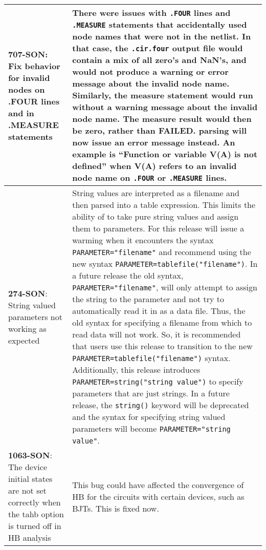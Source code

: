 {\begin{longtable}[h] {>{\raggedright\small}m{2in}|>{\raggedright\let\\\tabularnewline\small}m{3.5in}}
     \textbf{707-SON}: Fix behavior for invalid nodes on .FOUR lines and in 
     .MEASURE statements & There were issues with \texttt{.FOUR} lines and
     \texttt{.MEASURE} statements that accidentally used node names that
     were not in the netlist.  In that case, the \texttt{.cir.four} output
     file would contain a mix of all zero's and NaN's, and \Xyce{} would 
     not produce a warning or error message about the invalid node name.
     Similarly, the measure statement would run without a warning message
     about the invalid node name.  The measure result would then be zero,
     rather than FAILED.  \Xyce{} parsing will now issue an error message
     instead.  An example is ``Function or variable V(A) is not defined'' 
     when V(A) refers to an invalid node name on \texttt{.FOUR} or 
     \texttt{.MEASURE} lines. \\ \hline
     
     \textbf{274-SON}: String valued parameters not working as expected &
     String values are interpreted as a filename and then parsed into a 
     table expression.  This limits the ability of \Xyce{} to take pure
     string values and assign them to parameters.  For this release
     \Xyce{} will issue a warming when it encounters the syntax 
     \texttt{PARAMETER="filename"} and recommend using the new syntax
     \texttt{PARAMETER=tablefile("filename")}.  In a future \Xyce{} release
     the old syntax, \texttt{PARAMETER="filename"}, will only attempt to assign
     the string to the parameter and not try to automatically read it in
     as a data file.  Thus, the old syntax for specifying a filename from 
     which to read data will not work.  So, it is recommended that users use this
     release to transition to the new \texttt{PARAMETER=tablefile("filename")}
     syntax.  Additionally, this release introduces 
     \texttt{PARAMETER=string("string value")} to specify parameters that 
     are just strings.  In a future release, the \texttt{string()} keyword will
     be deprecated and the syntax for specifying string valued parameters 
     will become \texttt{PARAMETER="string value"}.\\ \hline 


     \textbf{1063-SON}: The device initial states are not set correctly when
     the tahb option is turned off in HB analysis  & This bug could have
     affected the convergence of HB for the circuits with certain devices, such as BJTs.
     This is fixed now. \\ \hline


\end{longtable}}
